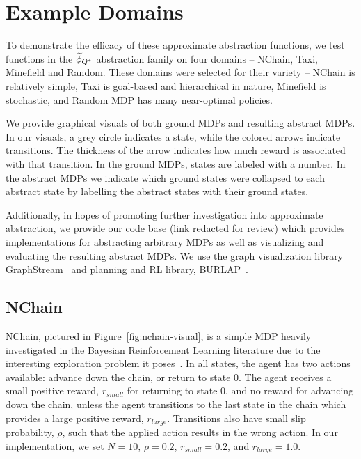 \section{Example Domains}
To demonstrate the efficacy of these approximate abstraction functions, we test functions in the $\widetilde \phi_{Q^*}$ abstraction family on four domains -- NChain, Taxi, Minefield and Random. These domains were selected for their variety -- NChain is relatively simple, Taxi is goal-based and hierarchical in nature, Minefield is stochastic, and Random MDP has many near-optimal policies.

We provide graphical visuals of both ground \acp{MDP} and resulting abstract \acp{MDP}. In our visuals, a grey circle indicates a state, while the colored arrows indicate transitions. The thickness of the arrow indicates how much reward is associated with that transition. In the ground \acp{MDP}, states are labeled with a number. In the abstract \acp{MDP} we indicate which ground states were collapsed to each abstract state by labelling the abstract states with their ground states. %

Additionally, in hopes of promoting further investigation into approximate abstraction, we provide our code base (link redacted for review) which provides implementations for abstracting arbitrary \acp{MDP} as well as visualizing and evaluating the resulting abstract \acp{MDP}. We use the graph visualization library GraphStream~\cite{graphstream} and planning and \ac{RL} library, BURLAP~\cite{BURLAPCITATION}.

\subsection{NChain}

NChain, pictured in Figure~\ref{fig:nchain-visual}, is a simple MDP heavily investigated in the Bayesian Reinforcement Learning literature due to the interesting exploration problem it poses~\cite{dearden1998bayesian}. In all states, the agent has two actions available: advance down the chain, or return to state 0. The agent receives a small positive reward, $r_{small}$ for returning to state 0, and no reward for advancing down the chain, unless the agent transitions to the last state in the chain which provides a large positive reward, $r_{large}$. Transitions also have small slip probability, $\rho$, such that the applied action results in the wrong action. In our implementation, we set $N=10$, $\rho=0.2$, $r_{small} = 0.2$, and $r_{large} = 1.0$.


